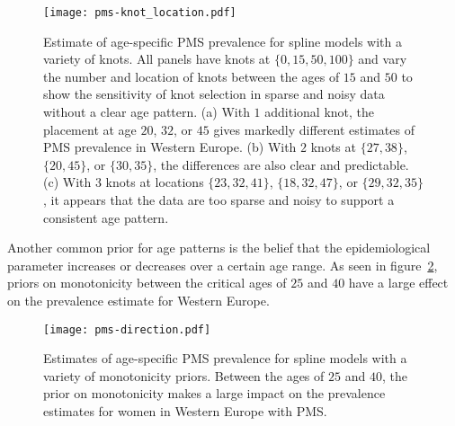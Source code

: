     \begin{figure}
        \begin{center}
            \texttt{[image: pms-knot\_location.pdf]}
        \end{center}
        \caption[Estimate of age-specific PMS prevalence for spline
          models with a variety of knots.]{Estimate of age-specific PMS
          prevalence for spline models with a variety of knots.  All
          panels have knots at $\{0, 15, 50, 100\}$ and vary the number
          and location of knots between the ages of $15$ and $50$ to show
          the sensitivity of knot selection in sparse and noisy data
          without a clear age pattern. (a) With $1$ additional knot, the
          placement at age $20$, $32$, or $45$ gives markedly different
          estimates of PMS prevalence in Western Europe.  (b) With $2$
          knots at $\{27, 38\}$, $\{20, 45\}$, or $\{30, 35\}$, the
          differences are also clear and predictable. (c) With $3$ knots
          at locations $\{23, 32, 41\}$, $\{18, 32, 47\}$, or $\{29, 32,
          35\}$, it appears that the data are too sparse and noisy to
          support a consistent age pattern.}
        \label{fig:app-pms knot_loc}
    \end{figure}

Another common prior for age patterns is the belief that the
epidemiological parameter increases or decreases over a certain age
range.  As seen in figure~\ref{fig:app-pms dir}, priors on
monotonicity between the critical ages of $25$ and $40$ have a large
effect on the prevalence estimate for Western Europe.

    \begin{figure}
        \begin{center}
            \texttt{[image: pms-direction.pdf]}
        \end{center}
        \caption[Estimates of age-specific PMS prevalence for spline
          models with a variety of monotonicity priors.]{Estimates of
          age-specific PMS prevalence for spline models with a variety
          of monotonicity priors. Between the ages of $25$ and $40$, the prior
          on monotonicity makes a large impact on the prevalence
          estimates for women in Western Europe with PMS.}
        \label{fig:app-pms dir}
    \end{figure}

